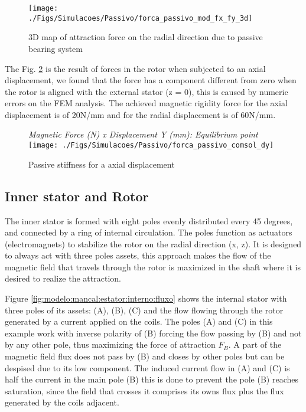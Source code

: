 \documentclass[10pt,fleqn,a4paper,twoside]{article}
\begin{document}
	\begin{figure}[th]
		\centering
		\texttt{[image: ./Figs/Simulacoes/Passivo/forca\_passivo\_mod\_fx\_fy\_3d]}
		\caption{3D map of attraction force on the radial direction due to passive bearing system}
		\label{fig:forca:passivo:mod:fx:fy:3d}
	\end{figure}
	
	The Fig. \ref{fig:forca:passivo:comsol:dy} is the result of forces in the rotor when subjected to an axial displacement, we found that the force has a component different from zero when the rotor is aligned with the external stator (z = 0), this is caused by numeric errors on the FEM analysis. The achieved magnetic rigidity force for the axial displacement is of 20N/mm and for the radial displacement is of 60N/mm. 
	
	\begin{figure}[ht]
		\centering
		{\textit{Magnetic Force (N) x Displacement Y (mm): Equilibrium point}}\\
		\texttt{[image: ./Figs/Simulacoes/Passivo/forca\_passivo\_comsol\_dy]}
		\caption{Passive stiffness for a axial displacement }
		\label{fig:forca:passivo:comsol:dy}
	\end{figure}
	
	\subsection{Inner stator and Rotor}
	
	The inner stator is formed with eight poles evenly distributed every 45 degrees, and connected by a ring of internal circulation. The poles function as actuators (electromagnets) to stabilize the rotor on the radial direction (x, z).  It is designed to always act with three poles assets, this approach makes the flow of the magnetic field that travels through the rotor is maximized in the shaft where it is desired to realize the attraction.
	
	Figure \ref{fig:modelo:mancal:estator:interno:fluxo} shows the internal stator with three poles of its assets: (A), (B), (C) and the flow flowing through the rotor generated by a current applied on the coils. The poles (A) and (C) in this example work with inverse polarity of (B) forcing the flow passing by (B) and not by any other pole, thus maximizing the force of attraction $F_B$. A part of the magnetic field flux does not pass by (B) and closes by other poles but can be despised due to its low component. The induced current flow in (A) and (C) is half the current in the main pole (B) this is done to prevent the pole (B) reaches saturation, since the field that crosses it comprises its owns flux plus the flux generated by the coils adjacent. 
	
\end{document}

